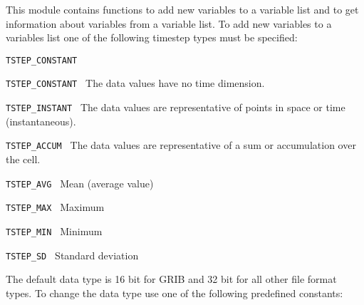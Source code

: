 This module contains functions to add new variables to a
variable list and to get information about variables from
a variable list. To add new variables to a variables list
one of the following timestep types must be specified:

\vspace*{3mm}
\hspace*{8mm}\begin{minipage}{15cm}
\begin{deflist}{\large\texttt{TSTEP\_CONSTANT \ \ }}
\item[{\large\texttt{TSTEP\_CONSTANT }}]  The data values have no time dimension.
\item[{\large\texttt{TSTEP\_INSTANT }}]  The data values are representative of points in space or time (instantaneous).
\item[{\large\texttt{TSTEP\_ACCUM }}]  The data values are representative of a sum or accumulation over the cell.
\item[{\large\texttt{TSTEP\_AVG }}]  Mean (average value)  
\item[{\large\texttt{TSTEP\_MAX }}]  Maximum  
\item[{\large\texttt{TSTEP\_MIN }}]  Minimum
\item[{\large\texttt{TSTEP\_SD }}]  Standard deviation
\end{deflist}
\end{minipage}
\vspace*{3mm}

The default data type is 16 bit for GRIB and 32 bit for all other file
format types. To change the data type use one of the following 
predefined constants:

